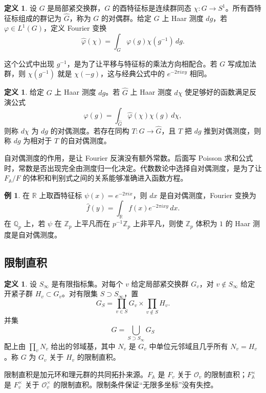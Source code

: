 \documentclass[11pt,a4paper,openany]{ctexbook}
\numberwithin{equation}{chapter}
\newcommand{\Q}{\mathbb{Q}}
\newcommand{\R}{\mathbb{R}}
\newcommand{\Z}{\mathbb{Z}}
\newcommand{\A}{\mathbb{A}}
\theoremstyle{plain}
\theoremstyle{definition}
\newtheorem{definition}[theorem]{定义}
\newtheorem{example}[theorem]{例}
\theoremstyle{remark}
\begin{document}
\begin{definition}
设 $G$ 是局部紧交换群，$G$ 的酉特征标是连续群同态 $\chi:G\to S^1$。所有酉特征标组成的群记为 $\widehat G$，称为 $G$ 的对偶群。给定 $G$ 上 Haar 测度 $dg$，若 $\varphi\in L^1(G)$，定义 Fourier 变换
\[
  \widehat\varphi(\chi)=\int_G\varphi(g)\chi(g^{-1})\,dg .
\]
\end{definition}

这个公式中出现 $g^{-1}$，是为了让平移与特征标的乘法方向相配合。若 $G$ 写成加法群，则 $\chi(g^{-1})$ 就是 $\chi(-g)$，这与经典公式中的 $e^{-2\pi ixy}$ 相同。

\begin{definition}
给定 $G$ 上 Haar 测度 $dg$。若 $\widehat G$ 上 Haar 测度 $d\chi$ 使足够好的函数满足反演公式
\[
  \varphi(g)=\int_{\widehat G}\widehat\varphi(\chi)\chi(g)\,d\chi,
\]
则称 $d\chi$ 为 $dg$ 的对偶测度。若存在同构 $T:G\to\widehat G$，且 $T$ 把 $dg$ 推到对偶测度，则称 $dg$ 为相对于 $T$ 的自对偶测度。
\end{definition}

自对偶测度的作用，是让 Fourier 反演没有额外常数。后面写 Poisson 求和公式时，常数是否出现完全由测度归一化决定。代数数论中选择自对偶测度，是为了让 $F_{\A}/F$ 的体积和判别式之间的关系能够准确进入函数方程。

\begin{example}
在 $\R$ 上取酉特征标 $\psi(x)=e^{-2\pi ix}$，则 $dx$ 是自对偶测度，Fourier 变换为
\[
  \widehat f(y)=\int_{\R}f(x)e^{-2\pi ixy}\,dx .
\]
在 $\Q_p$ 上，若 $\psi$ 在 $\Z_p$ 上平凡而在 $p^{-1}\Z_p$ 上非平凡，则使 $\Z_p$ 体积为 $1$ 的 Haar 测度是自对偶测度。
\end{example}

\subsection{限制直积}

\begin{definition}
设 $S_\infty$ 是有限指标集。对每个 $v$ 给定局部紧交换群 $G_v$，对 $v\notin S_\infty$ 给定开紧子群 $H_v\subset G_v$。对有限集 $S\supset S_\infty$，置
\[
  G_S=\prod_{v\in S}G_v\times\prod_{v\notin S}H_v .
\]
并集
\[
  G=\bigcup_{S\supset S_\infty}G_S
\]
配上由 $\prod_vN_v$ 给出的邻域基，其中 $N_v$ 是 $G_v$ 中单位元邻域且几乎所有 $N_v=H_v$。称 $G$ 为 $G_v$ 关于 $H_v$ 的限制直积。
\end{definition}

限制直积是加元环和理元群的共同拓扑来源。$F_{\A}$ 是 $F_v$ 关于 $\mathcal O_v$ 的限制直积；$F_{\A}^{\times}$ 是 $F_v^{\times}$ 关于 $\mathcal O_v^{\times}$ 的限制直积。限制条件保证“无限多坐标”没有失控。
\end{document}
